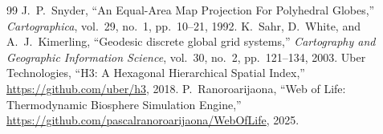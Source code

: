 \documentclass[10pt,journal,compsoc]{IEEEtran}
\begin{document}
\begin{thebibliography}{99}
J.~P.~Snyder, ``An Equal-Area Map Projection For Polyhedral Globes,'' \emph{Cartographica}, vol.~29, no.~1, pp.~10--21, 1992.
K.~Sahr, D.~White, and A.~J.~Kimerling, ``Geodesic discrete global grid systems,'' \emph{Cartography and Geographic Information Science}, vol.~30, no.~2, pp.~121--134, 2003.
Uber Technologies, ``H3: A Hexagonal Hierarchical Spatial Index,'' \url{https://github.com/uber/h3}, 2018.
P.~Ranoroarijaona, ``Web of Life: Thermodynamic Biosphere Simulation Engine,'' \url{https://github.com/pascalranoroarijaona/WebOfLife}, 2025.
\end{thebibliography}
\end{document}
